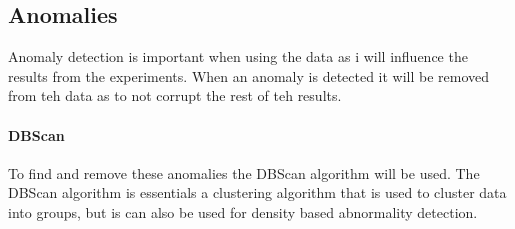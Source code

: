 \subsection{Anomalies}
Anomaly detection is important when using the data as i will influence the results from the experiments. When an anomaly is detected it will be removed from teh data as to not corrupt the rest of teh results.
\paragraph{DBScan}
To find and remove these anomalies the DBScan algorithm will be used. The DBScan algorithm is essentials a clustering algorithm that is used to cluster data into groups, but is can also be used for density based abnormality detection.
\begin{lstlisting}
    
\end{lstlisting}